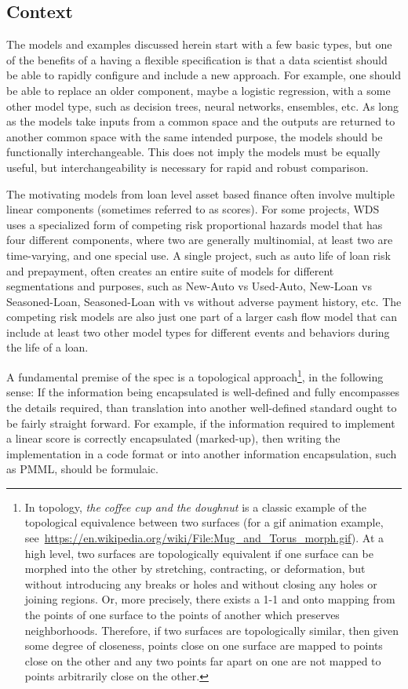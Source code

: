 \documentclass[10pt]{article}
\begin{document}
\subsection{Context}


The models and examples discussed herein start with a few basic types, but one of the benefits of a having a flexible
specification is that a data scientist should be able to rapidly configure and include a new approach.  For example, one should be able to
replace an older component, maybe a logistic regression, with a some other model type, such as decision trees, neural networks, ensembles,
etc. As long as the models take inputs from a common space and the outputs are returned to another common space with the same intended
purpose, the models should be functionally interchangeable.  This does not imply the models must be  equally useful, but interchangeability
is necessary for rapid and robust comparison.

The motivating models from loan level asset based finance often involve multiple linear components (sometimes referred to as scores).  For
some projects, WDS uses a specialized form of competing risk proportional hazards model that has four different components, where two are
generally multinomial, at least two are time-varying, and one special use.  A single project, such as auto life of loan risk and prepayment,
often creates an entire suite of models for different segmentations and purposes, such as New-Auto vs Used-Auto, New-Loan vs Seasoned-Loan,
Seasoned-Loan with vs without adverse payment history, etc.  The competing risk models are also just one part of a larger cash flow model
that can include at least two other model types for different events and behaviors during the life of a loan.

A fundamental premise of the spec is a  topological approach\footnote{In topology, {\em the coffee cup and the
doughnut} is a classic example of the topological equivalence between two surfaces (for a gif animation example,
see~\url{https://en.wikipedia.org/wiki/File:Mug\_and\_Torus\_morph.gif}).  At a high level, two surfaces are topologically equivalent if one
surface can be morphed into the other by stretching, contracting, or deformation, but without introducing any breaks or holes and without
closing any holes or joining regions. Or, more precisely, there exists a 1-1 and onto mapping from the points of one surface to the points of another which
preserves neighborhoods.  Therefore, if two surfaces are topologically similar, then given some degree of closeness, points close on one
surface are mapped to points close on the other and any two points far apart on one are not mapped to points arbitrarily close on the
other.}, in the following sense:  If the information being
encapsulated is well-defined and fully encompasses the details required, than translation into another well-defined standard ought to be
fairly straight forward.  For example, if the information required to implement a linear score is correctly encapsulated (marked-up),
then writing the implementation in a code format or into another information encapsulation, such as PMML, should be formulaic.
\end{document}
